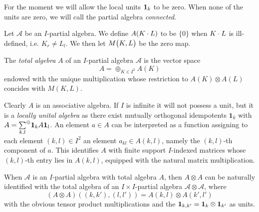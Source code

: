 \begin{Rem} For the moment we will allow the local units $\mathbf{1}_k$ to be zero. When none of the units are zero, we will call the partial algebra \emph{connected}. 
\end{Rem}

Let $\mathscr{A}$ be an $I$-partial algebra. We define $A(K\cdot L)$ to be $\{0\}$ when $K\cdot L$ is ill-defined, i.e. $K_r\neq L_l$. We then let $M{\begin{pmatrix} K, L\end{pmatrix}}$ be the zero map.

\begin{Def} The \emph{total algebra} $A$ of an $I$-partial algebra $\mathscr{A}$ is the vector space \[A = \oplus_{K\in I^2} A(K)\] endowed with the unique multiplication whose restriction to $A(K)\otimes A(L)$ concides with $M(K,L)$.  
\end{Def} 
Clearly $A$ is an associative algebra. If $I$ is infinite it will not possess a unit, but it is a \emph{locally unital algebra} as there exist mutually orthogonal idempotents $\mathbf{1}_k$ with $A = \underset{k,l}{\sum}^{\oplus} \mathbf{1}_kA\mathbf{1}_l$. An element $a\in A$ can be interpreted as a function assigning to each element $(k,l)\in I^2$ an element $a_{kl}\in A(k,l)$, namely the $(k,l)$-th component of $a$. This identifies $A$ with finite support $I$-indexed matrices whose $(k,l)$-th entry lies in $A(k,l)$, equipped with the natural matrix multiplication. 

\begin{Rem}\label{RemGrad} When $\mathscr{A}$ is an $I$-partial algebra with total algebra $A$, then $A\otimes A$ can be naturally identified with the total algebra of an $I\times I$-partial algebra $\mathscr{A}\otimes \mathscr{A}$, where \[(A\otimes A)((k,k'),(l,l')) = A(k,l)\otimes A(k',l')\] with the obvious tensor product multiplications and the $\mathbf{1}_{k,k'} = \mathbf{1}_k\otimes \mathbf{1}_{k'}$ as units. 
\end{Rem} 


